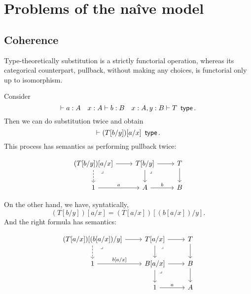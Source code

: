 \section{Problems of the naîve model}

\subsection{Coherence}
Type-theoretically substitution is a strictly functorial operation, whereas its categorical counterpart, pullback, without making any choices, is functorial only up to isomorphism.

Consider $$\vdash a :A \quad x: A\vdash b:B \quad x:A,y:B\vdash T \operatorname{\textsf{ type}}.$$ Then we can do substitution twice and obtain $$\vdash (T[b/y])[a/x] \operatorname{\textsf{ type}}.$$ This process has semantics as performing pullback twice:

\[\begin{tikzcd}
	{(T[b/y])[a/x]} & {T[b/y]} & T \\
	1 & A & B
	\arrow[from=1-1, to=1-2]
	\arrow[dashed, from=1-1, to=2-1]
	\arrow[from=1-2, to=1-3]
	\arrow[from=1-2, to=2-2]
	\arrow[from=1-3, to=2-3]
	\arrow[""{name=0, anchor=center, inner sep=0}, "{a}", from=2-1, to=2-2]
	\arrow[""{name=1, anchor=center, inner sep=0}, "{b}", from=2-2, to=2-3]
	\arrow["\lrcorner"{anchor=center, pos=0.125}, draw=none, from=1-1, to=0]
	\arrow["\lrcorner"{anchor=center, pos=0.125}, draw=none, from=1-2, to=1]
\end{tikzcd}\]

On the other hand, we have, syntatically, $$(T[b/y])[a/x] = (T[a/x])[(b[a/x])/y].$$
And the right formula has semantics:

\[\begin{tikzcd}
	{(T[a/x])[(b[a/x])/y]} & {T[a/x]} & T \\
	1 & {B[a/x]} & B \\
	& 1 & A
	\arrow[from=1-1, to=1-2]
	\arrow[dashed, from=1-1, to=2-1]
	\arrow[from=1-2, to=1-3]
	\arrow[from=1-2, to=2-2]
	\arrow[from=1-3, to=2-3]
	\arrow[""{name=0, anchor=center, inner sep=0}, "{b[a/x]}", from=2-1, to=2-2]
	\arrow[""{name=1, anchor=center, inner sep=0}, from=2-2, to=2-3]
	\arrow[from=2-2, to=3-2]
	\arrow[from=2-3, to=3-3]
	\arrow[""{name=2, anchor=center, inner sep=0}, "{a}", from=3-2, to=3-3]
	\arrow["\lrcorner"{anchor=center, pos=0.125}, draw=none, from=1-1, to=0]
	\arrow["\lrcorner"{anchor=center, pos=0.125}, draw=none, from=1-2, to=1]
	\arrow["\lrcorner"{anchor=center, pos=0.125}, draw=none, from=2-2, to=2]
\end{tikzcd}\]

